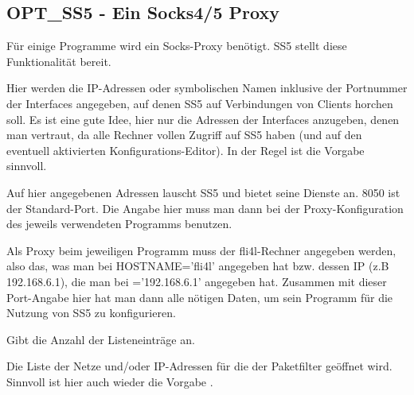 \subsection{OPT\_SS5 - Ein Socks4/5 Proxy}

Für einige Programme wird ein Socks-Proxy benötigt. SS5 stellt diese
Funktionalität bereit.


\begin{description}



        {Hier werden die IP-Adressen oder symbolischen Namen inklusive
        der Portnummer der Interfaces angegeben, auf denen SS5 auf
        Verbindungen von Clients horchen soll. Es ist eine gute Idee,
        hier nur die Adressen der Interfaces anzugeben, denen man
        vertraut, da alle Rechner vollen Zugriff auf SS5 haben
        (und auf den eventuell aktivierten Konfigurations-Editor). In
        der Regel ist die Vorgabe 
        sinnvoll.

        Auf hier angegebenen Adressen lauscht SS5 und bietet seine
        Dienste an.  8050 ist der Standard-Port. Die Angabe hier muss
        man dann bei der Proxy-Konfiguration des jeweils verwendeten
        Programms benutzen.

        Als Proxy beim jeweiligen Programm muss der fli4l-Rechner
        angegeben werden, also das, was man bei HOSTNAME='fli4l'
        angegeben hat bzw.  dessen IP (z.B 192.168.6.1), die man bei
        ='192.168.6.1' angegeben hat. Zusammen
        mit dieser Port-Angabe hier hat man dann alle nötigen Daten,
        um sein Programm für die Nutzung von SS5 zu
        konfigurieren.}


        {Gibt die Anzahl der Listeneinträge an.}


        Die Liste der Netze und/oder IP-Adressen für die der
        Paketfilter geöffnet wird. Sinnvoll ist hier auch wieder die
        Vorgabe .

\end{description}


